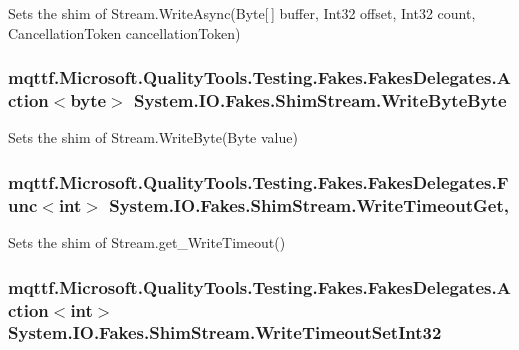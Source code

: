 Sets the shim of Stream.\-Write\-Async(\-Byte\mbox{[}$\,$\mbox{]} buffer, Int32 offset, Int32 count, Cancellation\-Token cancellation\-Token)

\hypertarget{class_system_1_1_i_o_1_1_fakes_1_1_shim_stream_a66e80091b4ba9acd098ea4f66d07e737}{
\subsubsection[{Write\-Byte\-Byte}]{\setlength{\rightskip}{0pt plus 5cm}mqttf.\-Microsoft.\-Quality\-Tools.\-Testing.\-Fakes.\-Fakes\-Delegates.\-Action$<$byte$>$ System.\-I\-O.\-Fakes.\-Shim\-Stream.\-Write\-Byte\-Byte\hspace{0.3cm}{\ttfamily [set]}}}\label{class_system_1_1_i_o_1_1_fakes_1_1_shim_stream_a66e80091b4ba9acd098ea4f66d07e737}


Sets the shim of Stream.\-Write\-Byte(\-Byte value)

\hypertarget{class_system_1_1_i_o_1_1_fakes_1_1_shim_stream_ab633fca1be38a9b235a845a0b0511f2e}{
\subsubsection[{Write\-Timeout\-Get}]{\setlength{\rightskip}{0pt plus 5cm}mqttf.\-Microsoft.\-Quality\-Tools.\-Testing.\-Fakes.\-Fakes\-Delegates.\-Func$<$int$>$ System.\-I\-O.\-Fakes.\-Shim\-Stream.\-Write\-Timeout\-Get\hspace{0.3cm}{\ttfamily [get]}, {\ttfamily [set]}}}\label{class_system_1_1_i_o_1_1_fakes_1_1_shim_stream_ab633fca1be38a9b235a845a0b0511f2e}


Sets the shim of Stream.\-get\-\_\-\-Write\-Timeout()

\hypertarget{class_system_1_1_i_o_1_1_fakes_1_1_shim_stream_ad9108789e45db235989e67db58ddbe27}{
\subsubsection[{Write\-Timeout\-Set\-Int32}]{\setlength{\rightskip}{0pt plus 5cm}mqttf.\-Microsoft.\-Quality\-Tools.\-Testing.\-Fakes.\-Fakes\-Delegates.\-Action$<$int$>$ System.\-I\-O.\-Fakes.\-Shim\-Stream.\-Write\-Timeout\-Set\-Int32\hspace{0.3cm}{\ttfamily [set]}}}\label{class_system_1_1_i_o_1_1_fakes_1_1_shim_stream_ad9108789e45db235989e67db58ddbe27}


